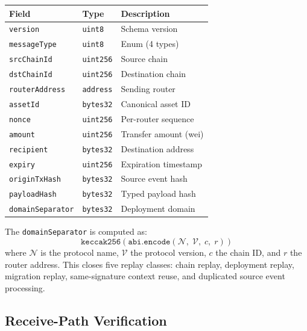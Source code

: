 \begin{center}
\small
\begin{tabular}{@{}lll@{}}
\toprule
\textbf{Field} & \textbf{Type} & \textbf{Description} \\
\midrule
\texttt{version}         & \texttt{uint8}   & Schema version \\
\texttt{messageType}     & \texttt{uint8}   & Enum (4 types) \\
\texttt{srcChainId}      & \texttt{uint256} & Source chain \\
\texttt{dstChainId}      & \texttt{uint256} & Destination chain \\
\texttt{routerAddress}   & \texttt{address} & Sending router \\
\texttt{assetId}         & \texttt{bytes32} & Canonical asset ID \\
\texttt{nonce}           & \texttt{uint256} & Per-router sequence \\
\texttt{amount}          & \texttt{uint256} & Transfer amount (wei) \\
\texttt{recipient}       & \texttt{bytes32} & Destination address \\
\texttt{expiry}          & \texttt{uint256} & Expiration timestamp \\
\texttt{originTxHash}    & \texttt{bytes32} & Source event hash \\
\texttt{payloadHash}     & \texttt{bytes32} & Typed payload hash \\
\texttt{domainSeparator} & \texttt{bytes32} & Deployment domain \\
\bottomrule
\end{tabular}
\end{center}

The \texttt{domainSeparator} is computed as:
\begin{equation}
\texttt{keccak256}\!\left(\texttt{abi.encode}\!\left(\mathcal{N},\; \mathcal{V},\; c,\; r\right)\right)
\end{equation}
where $\mathcal{N}$ is the protocol name, $\mathcal{V}$ the protocol version, $c$ the chain ID, and $r$ the router address. This closes five replay classes: chain replay, deployment replay, migration replay, same-signature context reuse, and duplicated source event processing.


\subsection{Receive-Path Verification}

